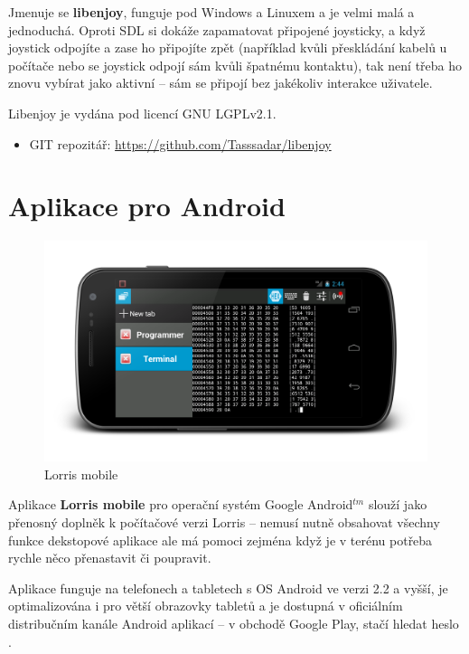 \documentclass[12pt, a4paper, oneside]{article}
\begin{document}
Jmenuje se {\bf libenjoy}, funguje pod Windows a Linuxem a je velmi malá a jednoduchá. Oproti SDL si dokáže zapamatovat připojené joysticky, a když joystick odpojíte a zase ho připojíte zpět (například kvůli přeskládání kabelů u počítače nebo se joystick odpojí sám kvůli špatnému kontaktu), tak není třeba ho znovu vybírat jako aktivní -- sám se připojí bez jakékoliv interakce uživatele.

Libenjoy je vydána pod licencí GNU LGPLv2.1\cite{lgpl}.

\begin{itemize}
\item GIT repozitář: \url{https://github.com/Tasssadar/libenjoy}
\end{itemize}

\newpage
\section{Aplikace pro Android}
\begin{figure}[H]
\begin{center}
\includegraphics[width=\textwidth]{img/mobile.png}
\caption{Lorris mobile}
\end{center}
\end{figure}
Aplikace {\bf Lorris mobile} pro operační systém Google Android$^{tm}$ slouží jako přenosný doplněk k počítačové verzi Lorris -- nemusí nutně obsahovat všechny funkce dekstopové aplikace ale má pomoci zejména když je v terénu potřeba rychle něco přenastavit či poupravit.

Aplikace funguje na telefonech a tabletech s OS Android ve verzi 2.2 a vyšší, je optimalizována i pro větší obrazovky tabletů a je dostupná v oficiálním distribučním kanále Android aplikací -- v obchodě Google Play\cite{gplay}, stačí hledat heslo .
\end{document}
